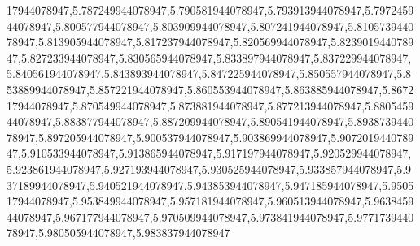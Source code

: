 17944078947,5.787249944078947,5.790581944078947,5.793913944078947,5.797245944078947,5.800577944078947,5.803909944078947,5.807241944078947,5.810573944078947,5.813905944078947,5.817237944078947,5.820569944078947,5.823901944078947,5.827233944078947,5.830565944078947,5.833897944078947,5.837229944078947,5.840561944078947,5.843893944078947,5.847225944078947,5.850557944078947,5.853889944078947,5.857221944078947,5.860553944078947,5.863885944078947,5.867217944078947,5.870549944078947,5.873881944078947,5.877213944078947,5.880545944078947,5.883877944078947,5.887209944078947,5.890541944078947,5.893873944078947,5.897205944078947,5.900537944078947,5.903869944078947,5.907201944078947,5.910533944078947,5.913865944078947,5.917197944078947,5.920529944078947,5.923861944078947,5.927193944078947,5.930525944078947,5.933857944078947,5.937189944078947,5.940521944078947,5.943853944078947,5.947185944078947,5.950517944078947,5.953849944078947,5.957181944078947,5.960513944078947,5.963845944078947,5.967177944078947,5.970509944078947,5.973841944078947,5.977173944078947,5.980505944078947,5.983837944078947
